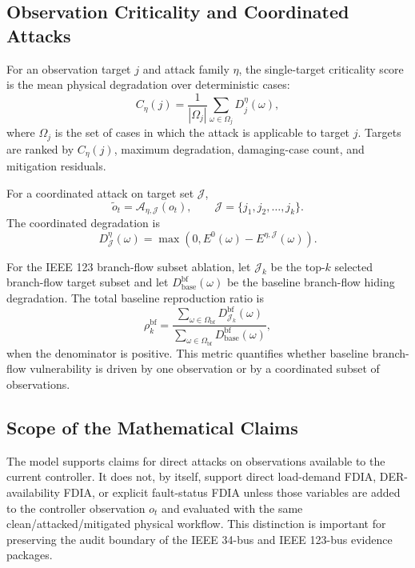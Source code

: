 \subsection{Observation Criticality and Coordinated Attacks}
\label{subsec:criticality_model}

For an observation target $j$ and attack family $\eta$, the single-target criticality score is the mean physical degradation over deterministic cases:
\begin{equation}
    C_{\eta}(j)
    =
    \frac{1}{|\Omega_j|}
    \sum_{\omega \in \Omega_j}
    D^{\eta}_{j}(\omega),
    \label{eq:criticality_score}
\end{equation}
where $\Omega_j$ is the set of cases in which the attack is applicable to target $j$. Targets are ranked by $C_{\eta}(j)$, maximum degradation, damaging-case count, and mitigation residuals.

For a coordinated attack on target set $\mathcal{J}$,
\begin{equation}
    \tilde{o}_t
    =
    \mathcal{A}_{\eta,\mathcal{J}}(o_t),
    \qquad
    \mathcal{J} = \{j_1,j_2,\ldots,j_k\}.
    \label{eq:coordinated_attack}
\end{equation}
The coordinated degradation is
\begin{equation}
    D^{\eta}_{\mathcal{J}}(\omega)
    =
    \max
    \left(
        0,
        E^0(\omega)
        -
        E^{\eta,\mathcal{J}}(\omega)
    \right).
    \label{eq:coordinated_degradation}
\end{equation}

For the IEEE 123 branch-flow subset ablation, let $\mathcal{J}_k$ be the top-$k$ selected branch-flow target subset and let $D_{\mathrm{base}}^{\mathrm{bf}}(\omega)$ be the baseline branch-flow hiding degradation. The total baseline reproduction ratio is
\begin{equation}
    \rho_k^{\mathrm{bf}}
    =
    \frac{
        \sum_{\omega \in \Omega_{\mathrm{bf}}}
        D^{\mathrm{bf}}_{\mathcal{J}_k}(\omega)
    }{
        \sum_{\omega \in \Omega_{\mathrm{bf}}}
        D_{\mathrm{base}}^{\mathrm{bf}}(\omega)
    },
    \label{eq:branchflow_reproduction}
\end{equation}
when the denominator is positive. This metric quantifies whether baseline branch-flow vulnerability is driven by one observation or by a coordinated subset of observations.

\subsection{Scope of the Mathematical Claims}
\label{subsec:model_scope}

The model supports claims for direct attacks on observations available to the current controller. It does not, by itself, support direct load-demand FDIA, DER-availability FDIA, or explicit fault-status FDIA unless those variables are added to the controller observation $o_t$ and evaluated with the same clean/attacked/mitigated physical workflow. This distinction is important for preserving the audit boundary of the IEEE 34-bus and IEEE 123-bus evidence packages.

